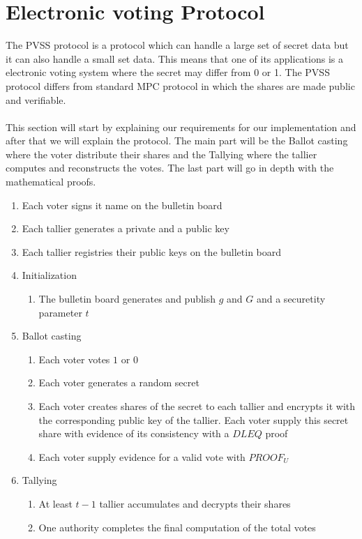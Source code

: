 \section{Electronic voting Protocol}
The PVSS protocol is a protocol which can handle a large set of secret data but it can also handle a small set data. This means that one of its applications is a  electronic voting system where the secret may differ from 0 or 1. The PVSS protocol differs from standard MPC protocol in which the shares are made public and verifiable.\\\\
This section will start by explaining our requirements for our implementation and after that we will explain the protocol. The main part will be the Ballot casting where the voter distribute their shares and the Tallying where the tallier computes and reconstructs the votes. The last part will go in depth with the mathematical proofs. \\

\noindent

\begin{infobox}
\begin{enumerate}
\item Each voter signs it name on the bulletin board
\item Each tallier generates a private and a public key
\item Each tallier registries their public keys on the bulletin board
\item Initialization
\begin{enumerate}
\item The bulletin board generates and publish $g$ and $G$ and a securetity parameter $t$
\end{enumerate}
\item Ballot casting
\begin{enumerate}
\item Each voter votes $1$ or $0$
\item Each voter generates a random secret
\item Each voter creates shares of the secret to each tallier and encrypts it with the corresponding public key of the tallier. Each voter supply this secret share with evidence of its consistency with a $DLEQ$ proof
\item Each voter supply evidence for a valid vote with $PROOF_U$
\end{enumerate}
\item Tallying
\begin{enumerate}
\item At least $t-1$ tallier accumulates and decrypts their shares
\item One authority completes the final computation of the total votes
\end{enumerate}
\end{enumerate}
\end{infobox}

